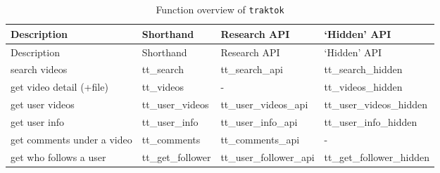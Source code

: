 \documentclass[
  nobib]{ccr}
\begin{document}
\begin{longtable}[]{@{}
  >{\raggedright\arraybackslash}p{}
  >{\raggedright\arraybackslash}p{}
  >{\raggedright\arraybackslash}p{}
  >{\raggedright\arraybackslash}p{}@{}}
\caption{Function overview of
\protect\texttt{traktok}}\label{tbl-overview}\tabularnewline
\toprule\noalign{}
\begin{minipage}[b]{\linewidth}\raggedright
Description
\end{minipage} & \begin{minipage}[b]{\linewidth}\raggedright
Shorthand
\end{minipage} & \begin{minipage}[b]{\linewidth}\raggedright
Research API
\end{minipage} & \begin{minipage}[b]{\linewidth}\raggedright
`Hidden' API
\end{minipage} \\
\midrule\noalign{}
\endfirsthead
\toprule\noalign{}
\begin{minipage}[b]{\linewidth}\raggedright
Description
\end{minipage} & \begin{minipage}[b]{\linewidth}\raggedright
Shorthand
\end{minipage} & \begin{minipage}[b]{\linewidth}\raggedright
Research API
\end{minipage} & \begin{minipage}[b]{\linewidth}\raggedright
`Hidden' API
\end{minipage} \\
\midrule\noalign{}
\endhead
\bottomrule\noalign{}
\endlastfoot
search videos & tt\_search & tt\_search\_api & tt\_search\_hidden \\
get video detail (+file) & tt\_videos & - & tt\_videos\_hidden \\
get user videos & tt\_user\_videos & tt\_user\_videos\_api &
tt\_user\_videos\_hidden \\
get user info & tt\_user\_info & tt\_user\_info\_api &
tt\_user\_info\_hidden \\
get comments under a video & tt\_comments & tt\_comments\_api & - \\
get who follows a user & tt\_get\_follower & tt\_user\_follower\_api &
tt\_get\_follower\_hidden \\

\end{longtable}
\end{document}
